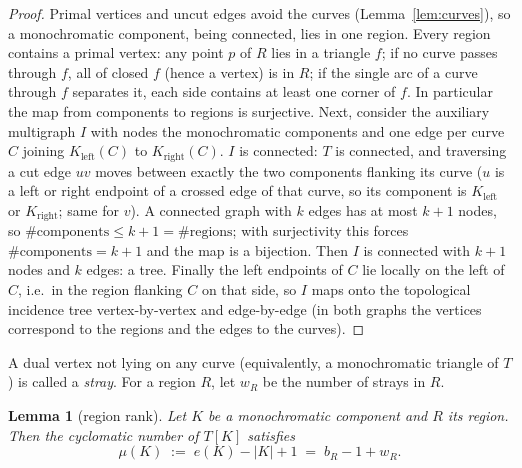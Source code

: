 \documentclass[11pt]{article}
\newtheorem{lemma}[theorem]{Lemma}
\theoremstyle{remark}
\begin{document}
\begin{proof}
Primal vertices and uncut edges avoid the curves (Lemma~\ref{lem:curves}),
so a monochromatic component, being connected, lies in one region. Every
region contains a primal vertex: any point $p$ of $R$ lies in a triangle
$f$; if no curve passes through $f$, all of closed $f$ (hence a vertex)
is in $R$; if the single arc of a curve through $f$ separates it, each
side contains at least one corner of $f$. In particular the map from
components to regions is surjective. Next, consider the auxiliary
multigraph $I$ with nodes the monochromatic components and one edge per
curve $C$ joining $K_{\mathrm{left}}(C)$ to $K_{\mathrm{right}}(C)$. $I$
is connected: $T$ is connected, and traversing a cut edge $uv$ moves
between exactly the two components flanking its curve ($u$ is a left or
right endpoint of a crossed edge of that curve, so its component is
$K_{\mathrm{left}}$ or $K_{\mathrm{right}}$; same for $v$). A connected
graph with $k$ edges has at most $k+1$ nodes, so
$\#\text{components}\le k+1=\#\text{regions}$; with surjectivity this
forces $\#\text{components}=k+1$ and the map is a bijection. Then $I$ is
connected with $k+1$ nodes and $k$ edges: a tree. Finally the left
endpoints of $C$ lie locally on the left of $C$, i.e.\ in the region
flanking $C$ on that side, so $I$ maps onto the topological incidence
tree vertex-by-vertex and edge-by-edge (in both graphs the vertices
correspond to the regions and the edges to the curves).
\end{proof}

A dual vertex not lying on any curve (equivalently, a monochromatic
triangle of $T$) is called a \emph{stray}. For a region $R$, let $w_R$ be
the number of strays in $R$.

\begin{lemma}[region rank]\label{lem:rank}
Let $K$ be a monochromatic component and $R$ its region. Then the
cyclomatic number of $T[K]$ satisfies
\[
\mu(K)\;:=\;e(K)-|K|+1\;=\;b_R-1+w_R.
\]
\end{lemma}
\end{document}
